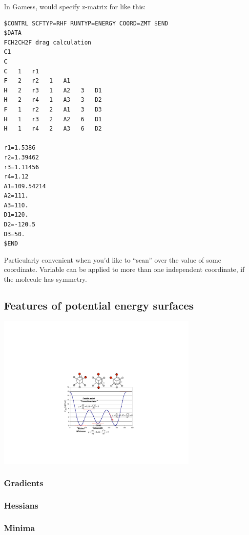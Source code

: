 \documentclass[11pt]{article}
\begin{document}
In Gamess, would specify z-matrix for  like this:
\begin{verbatim}
$CONTRL SCFTYP=RHF RUNTYP=ENERGY COORD=ZMT $END
$DATA
FCH2CH2F drag calculation
C1
C
C   1   r1
F   2   r2   1   A1
H   2   r3   1   A2   3   D1
H   2   r4   1   A3   3   D2
F   1   r2   2   A1   3   D3
H   1   r3   2   A2   6   D1
H   1   r4   2   A3   6   D2

r1=1.5386
r2=1.39462
r3=1.11456
r4=1.12
A1=109.54214
A2=111.
A3=110.
D1=120.
D2=-120.5
D3=50.
$END
\end{verbatim}
Particularly convenient when you'd like to ``scan'' over the value of some coordinate.  Variable can be applied to more than one independent coordinate, if the molecule has symmetry.

\subsection{Features of potential energy surfaces}
\label{sec:orgd081760}
\begin{center}
\begin{center}
\includegraphics[width=0.75\textwidth]{./Images/PES.pdf}
\end{center}
\end{center}

\subsubsection{Gradients}
\label{sec:orge0bce85}

\subsubsection{Hessians}
\label{sec:org94cd0ff}

\subsubsection{Minima}
\label{sec:orgefd90c8}
\end{document}
